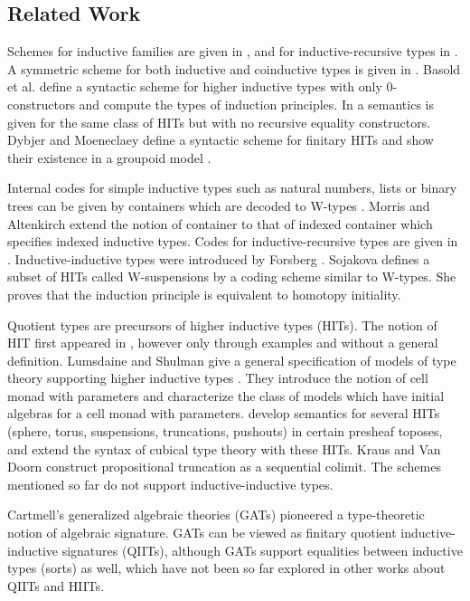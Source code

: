 \documentclass[dvipsnames]{lmcs} %
\newcommand{\1}{\mathsf{1}} \renewcommand{\Pr}{\mathsf{Pr}}
\theoremstyle{plain}\newtheorem{satz}[thm]{Satz} %
\begin{document}
\subsection{Related Work}

Schemes for inductive families are given in
\cite{Dybjer97inductivefamilies,paulinmohring}, and for inductive-recursive
types in \cite{dybjer00ir}. A symmetric scheme for both inductive and
coinductive types is given in \cite{henning}. Basold et al. \cite{niels} define
a syntactic scheme for higher inductive types with only 0-constructors and
compute the types of induction principles. In \cite{nielsmsc} a semantics is
given for the same class of HITs but with no recursive equality
constructors. Dybjer and Moeneclaey define a syntactic scheme for finitary HITs
and show their existence in a groupoid model \cite{moeneclaey}.

Internal codes for simple inductive types such as natural numbers, lists or
binary trees can be given by containers which are decoded to W-types
\cite{abbot05containers}. Morris and Altenkirch \cite{morris09indexed} extend
the notion of container to that of indexed container which specifies indexed
inductive types. Codes for inductive-recursive types are given in
\cite{Dybjer99afinite}. Inductive-inductive types were introduced by Forsberg
\cite{forsberg-phd}. Sojakova \cite{sojakova} defines a subset of HITs called
W-suspensions by a coding scheme similar to W-types. She proves that the
induction principle is equivalent to homotopy initiality.

Quotient types \cite{hofmann95extensional} are precursors of higher inductive
types (HITs). The notion of HIT first appeared in \cite{HoTTbook}, however only
through examples and without a general definition.  Lumsdaine and Shulman give a
general specification of models of type theory supporting higher inductive types
\cite{lumsdaineShulman}. They introduce the notion of cell monad with parameters
and characterize the class of models which have initial algebras for a cell
monad with parameters. \cite{cubicalhits} develop semantics for several HITs
(sphere, torus, suspensions, truncations, pushouts) in certain presheaf toposes,
and extend the syntax of cubical type theory \cite{ctt} with these HITs. Kraus
\cite{krausprop} and Van Doorn \cite{doorn} construct propositional truncation
as a sequential colimit. The schemes mentioned so far do not support
inductive-inductive types.

Cartmell's generalized algebraic theories (GATs) \cite{gat} pioneered a
type-theoretic notion of algebraic signature. GATs can be viewed as finitary
quotient inductive-inductive signatures (QIITs), although GATs support equalities
between inductive types (sorts) as well, which have not been so far explored in
other works about QIITs and HIITs.
\end{document}

